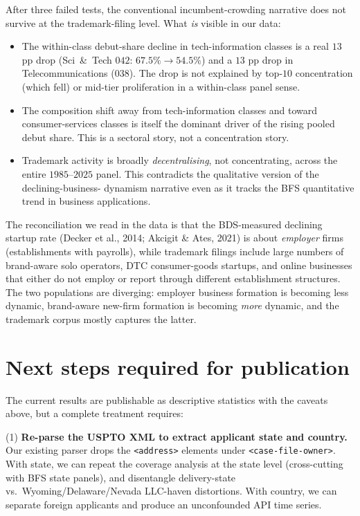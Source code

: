 \documentclass[11pt]{article}
\begin{document}
After three failed tests, the conventional incumbent-crowding
narrative does not survive at the trademark-filing level. What
\emph{is} visible in our data:
\begin{itemize}\setlength\itemsep{2pt}
\item The within-class debut-share decline in tech-information
  classes is a real $13$ pp drop (Sci~\&~Tech $042$:
  $67.5\% \to 54.5\%$) and a $13$ pp drop in Telecommunications
  ($038$). The drop is not explained by top-$10$ concentration
  (which fell) or mid-tier proliferation in a within-class panel
  sense.
\item The composition shift away from tech-information classes and
  toward consumer-services classes is itself the dominant driver of
  the rising pooled debut share. This is a sectoral story, not a
  concentration story.
\item Trademark activity is broadly \emph{decentralising}, not
  concentrating, across the entire $1985$--$2025$ panel. This
  contradicts the qualitative version of the declining-business-
  dynamism narrative even as it tracks the BFS quantitative trend
  in business applications.
\end{itemize}
The reconciliation we read in the data is that the BDS-measured
declining startup rate
(Decker et al., 2014; Akcigit \& Ates, 2021) is about
\emph{employer} firms (establishments with payrolls), while
trademark filings include large numbers of brand-aware solo
operators, DTC consumer-goods startups, and online businesses that
either do not employ or report through different establishment
structures. The two populations are diverging: employer business
formation is becoming less dynamic, brand-aware new-firm formation
is becoming \emph{more} dynamic, and the trademark corpus mostly
captures the latter.

\section{Next steps required for publication}

The current results are publishable as descriptive statistics with
the caveats above, but a complete treatment requires:

(1) \textbf{Re-parse the USPTO XML to extract applicant state and
country.} Our existing parser drops the \texttt{<address>} elements
under \texttt{<case-file-owner>}. With state, we can repeat the
coverage analysis at the state level (cross-cutting with BFS state
panels), and disentangle delivery-state vs.\ Wyoming/Delaware/Nevada
LLC-haven distortions. With country, we can separate foreign
applicants and produce an unconfounded API time series.
\end{document}
